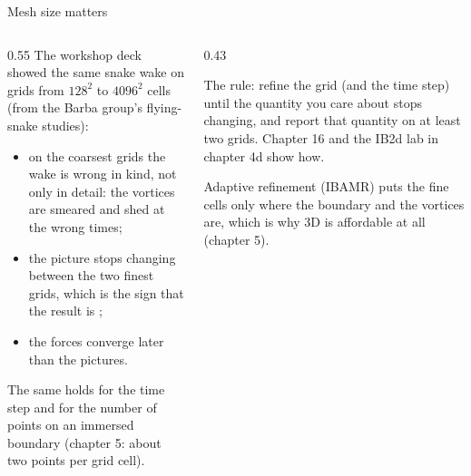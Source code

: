 \documentclass[aspectratio=169,11pt]{beamer}
\begin{document}
\begin{frame}{Mesh size matters}
\begin{columns}[T,onlytextwidth]
\begin{column}{0.55\textwidth}
The workshop deck showed the same snake wake on grids from $128^2$ to $4096^2$ cells (from the Barba group's flying-snake studies):
\begin{itemize}
  \item on the coarsest grids the wake is wrong in kind, not only in detail: the vortices are smeared and shed at the wrong times;
  \item the picture stops changing between the two finest grids, which is the sign that the result is ;
  \item the forces converge later than the pictures.
\end{itemize}
\vspace{1mm}
The same holds for the time step and for the number of points on an immersed boundary (chapter 5: about two points per grid cell).
\end{column}
\begin{column}{0.43\textwidth}
\begin{punchbox}
\small The rule: refine the grid (and the time step) until the quantity you care about stops changing, and report that quantity on at least two grids. Chapter 16 and the IB2d lab in chapter 4d show how.
\end{punchbox}
\vspace{2mm}
\small Adaptive refinement (IBAMR) puts the fine cells only where the boundary and the vortices are, which is why 3D is affordable at all (chapter 5).
\end{column}
\end{columns}
\end{frame}
\end{document}
